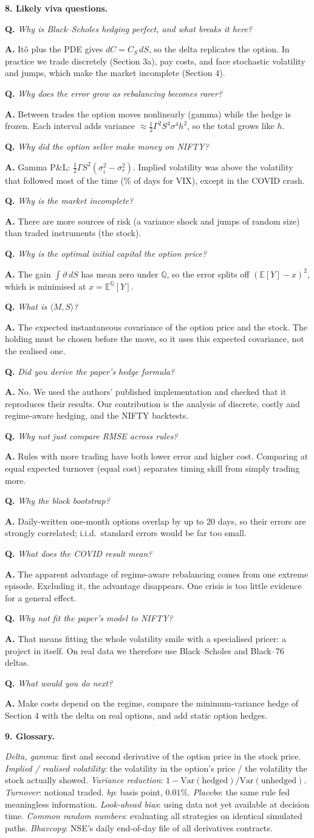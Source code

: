 \documentclass[10pt,leqno]{amsart}
\newcommand{\heading}[1]{\medskip\noindent\textbf{#1}\par}
\newcommand{\qa}[2]{\smallskip\noindent\textbf{Q.} \emph{#1}\par\noindent\textbf{A.} #2\par}
\begin{document}
\heading{8. Likely viva questions.}
\qa{Why is Black--Scholes hedging perfect, and what breaks it here?}{It\^o plus
the PDE gives $dC=C_S\,dS$, so the delta replicates the option. In practice we
trade discretely (Section 3a), pay costs, and face stochastic volatility and
jumps, which make the market incomplete (Section 4).}
\qa{Why does the error grow as rebalancing becomes rarer?}{Between trades the
option moves nonlinearly (gamma) while the hedge is frozen. Each interval adds
variance $\approx\frac12\Gamma^2S^4\sigma^4h^2$, so the total grows like $h$.}
\qa{Why did the option seller make money on NIFTY?}{Gamma P\&L:
$\frac12\Gamma S^2(\sigma_i^2-\sigma_r^2)$. Implied volatility was above the
volatility that followed most of the time (\IvrVixAbove\% of days for VIX), except
in the COVID crash.}
\qa{Why is the market incomplete?}{There are more sources of risk (a variance
shock and jumps of random size) than traded instruments (the stock).}
\qa{Why is the optimal initial capital the option price?}{The gain
$\int\vartheta\,dS$ has mean zero under $\mathbb{Q}$, so the error splits off
$(\mathbb{E}[Y]-x)^2$, which is minimised at $x=\mathbb{E}^{\mathbb{Q}}[Y]$.}
\qa{What is $\langle M,S\rangle$?}{The expected instantaneous covariance of the
option price and the stock. The holding must be chosen before the move, so it
uses this expected covariance, not the realised one.}
\qa{Did you derive the paper's hedge formula?}{No. We used the authors'
published implementation and checked that it reproduces their results. Our
contribution is the analysis of discrete, costly and regime-aware hedging, and
the NIFTY backtests.}
\qa{Why not just compare RMSE across rules?}{Rules with more trading have both
lower error and higher cost. Comparing at equal expected turnover (equal cost)
separates timing skill from simply trading more.}
\qa{Why the block bootstrap?}{Daily-written one-month options overlap by up to
20 days, so their errors are strongly correlated; i.i.d.\ standard errors would
be far too small.}
\qa{What does the COVID result mean?}{The apparent advantage of regime-aware
rebalancing comes from one extreme episode. Excluding it, the advantage
disappears. One crisis is too little evidence for a general effect.}
\qa{Why not fit the paper's model to NIFTY?}{That means fitting the whole
volatility smile with a specialised pricer: a project in itself. On real data we
therefore use Black--Scholes and Black--76 deltas.}
\qa{What would you do next?}{Make costs depend on the regime, compare the
minimum-variance hedge of Section 4 with the delta on real options, and add
static option hedges.}

\heading{9. Glossary.}
\noindent\emph{Delta, gamma}: first and second derivative of the option price
in the stock price.
\emph{Implied / realised volatility}: the volatility in the option's price /
the volatility the stock actually showed.
\emph{Variance reduction}: $1-\mathrm{Var}(\text{hedged})/\mathrm{Var}(\text{unhedged})$.
\emph{Turnover}: notional traded. \emph{bp}: basis point, $0.01\%$.
\emph{Placebo}: the same rule fed meaningless information.
\emph{Look-ahead bias}: using data not yet available at decision time.
\emph{Common random numbers}: evaluating all strategies on identical simulated paths.
\emph{Bhavcopy}: NSE's daily end-of-day file of all derivatives contracts.
\end{document}
